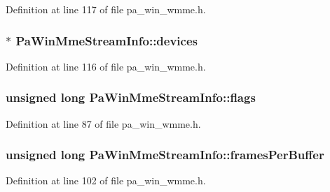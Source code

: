 Definition at line 117 of file pa\+\_\+win\+\_\+wmme.\+h.

\subsubsection[{\texorpdfstring{devices}{devices}}]{$\ast$ Pa\+Win\+Mme\+Stream\+Info\+::devices}\hypertarget{struct_pa_win_mme_stream_info_a5418cc496f75d7f93de251fa1953aba3}{}\label{struct_pa_win_mme_stream_info_a5418cc496f75d7f93de251fa1953aba3}


Definition at line 116 of file pa\+\_\+win\+\_\+wmme.\+h.

\subsubsection[{\texorpdfstring{flags}{flags}}]{\setlength{\rightskip}{0pt plus 5cm}unsigned long Pa\+Win\+Mme\+Stream\+Info\+::flags}\hypertarget{struct_pa_win_mme_stream_info_a3c253061ac0a54f2298f979343af90c4}{}\label{struct_pa_win_mme_stream_info_a3c253061ac0a54f2298f979343af90c4}


Definition at line 87 of file pa\+\_\+win\+\_\+wmme.\+h.

\subsubsection[{\texorpdfstring{frames\+Per\+Buffer}{framesPerBuffer}}]{\setlength{\rightskip}{0pt plus 5cm}unsigned long Pa\+Win\+Mme\+Stream\+Info\+::frames\+Per\+Buffer}\hypertarget{struct_pa_win_mme_stream_info_a187a4ecd4f51bb767eccbf9e9e19781b}{}\label{struct_pa_win_mme_stream_info_a187a4ecd4f51bb767eccbf9e9e19781b}


Definition at line 102 of file pa\+\_\+win\+\_\+wmme.\+h.

